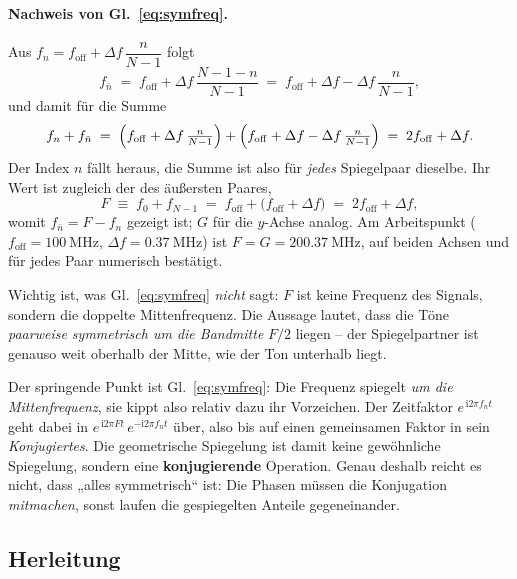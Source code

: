 \documentclass[11pt,a4paper]{article}
\begin{document}
\paragraph{Nachweis von Gl.~\eqref{eq:symfreq}.}
Aus $f_n = f_\mathrm{off}+\Delta f\,\dfrac{n}{N-1}$ folgt
\begin{equation}
  f_{\bar n} \;=\; f_\mathrm{off}+\Delta f\,\frac{N-1-n}{N-1}
             \;=\; f_\mathrm{off}+\Delta f-\Delta f\,\frac{n}{N-1} ,
\end{equation}
und damit für die Summe
\begin{equation}
  f_n + f_{\bar n}
  \;=\; \Bigl(f_\mathrm{off}+\Delta f\,\tfrac{n}{N-1}\Bigr)
      + \Bigl(f_\mathrm{off}+\Delta f-\Delta f\,\tfrac{n}{N-1}\Bigr)
  \;=\; 2f_\mathrm{off}+\Delta f .
  \label{eq:sumproof}
\end{equation}
Der Index $n$ fällt heraus, die Summe ist also für \emph{jedes} Spiegelpaar
dieselbe. Ihr Wert ist zugleich der des äußersten Paares,
\begin{equation}
  F \;\equiv\; f_0 + f_{N-1}
    \;=\; f_\mathrm{off} + \bigl(f_\mathrm{off}+\Delta f\bigr)
    \;=\; 2f_\mathrm{off}+\Delta f ,
\end{equation}
womit $f_{\bar n}=F-f_n$ gezeigt ist; $G$ für die $y$-Achse analog. Am
Arbeitspunkt ($f_\mathrm{off}=\SI{100}{\mega\hertz}$,
$\Delta f=\SI{0.37}{\mega\hertz}$) ist
$F=G=\SI{200.37}{\mega\hertz}$, auf beiden Achsen und für jedes Paar
numerisch bestätigt.

Wichtig ist, was Gl.~\eqref{eq:symfreq} \emph{nicht} sagt: $F$ ist keine
Frequenz des Signals, sondern die doppelte Mittenfrequenz. Die Aussage lautet,
dass die Töne \emph{paarweise symmetrisch um die Bandmitte} $F/2$ liegen -- der
Spiegelpartner ist genauso weit oberhalb der Mitte, wie der Ton unterhalb
liegt.

Der springende Punkt ist Gl.~\eqref{eq:symfreq}: Die Frequenz spiegelt
\emph{um die Mittenfrequenz}, sie kippt also relativ dazu ihr Vorzeichen. Der
Zeitfaktor $e^{\,\mathrm{i}2\pi f_n t}$ geht dabei in
$e^{\,\mathrm{i}2\pi F t}\,e^{-\mathrm{i}2\pi f_n t}$ über, also bis auf einen
gemeinsamen Faktor in sein \emph{Konjugiertes}. Die geometrische Spiegelung
ist damit keine gewöhnliche Spiegelung, sondern eine \textbf{konjugierende}
Operation. Genau deshalb reicht es nicht, dass „alles symmetrisch`` ist: Die
Phasen müssen die Konjugation \emph{mitmachen}, sonst laufen die
gespiegelten Anteile gegeneinander.

\subsection{Herleitung}
\end{document}

